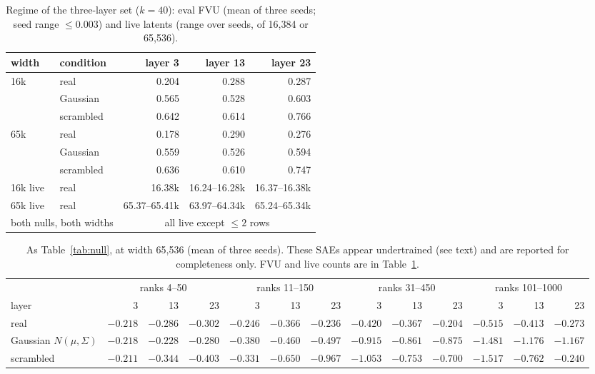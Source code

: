 \documentclass[10pt,twocolumn]{article}
\newcommand{\Sig}{\Sigma}
\begin{document}
\begin{table}[!htb]
\centering
\caption{Regime of the three-layer set ($k=40$): eval FVU (mean of three seeds; seed range $\le 0.003$) and live latents (range over seeds, of 16,384 or 65,536).}
\label{tab:fvu}
\footnotesize
\setlength{\tabcolsep}{2.5pt}
\begin{tabular}{ll rrr}
\toprule
width & condition & layer 3 & layer 13 & layer 23 \\
\midrule
\multirow{3}{*}{16k} & real & 0.204 & 0.288 & 0.287 \\
 & Gaussian & 0.565 & 0.528 & 0.603 \\
 & scrambled & 0.642 & 0.614 & 0.766 \\
\multirow{3}{*}{65k} & real & 0.178 & 0.290 & 0.276 \\
 & Gaussian & 0.559 & 0.526 & 0.594 \\
 & scrambled & 0.636 & 0.610 & 0.747 \\
\midrule
16k live & real & 16.38k & 16.24--16.28k & 16.37--16.38k \\
65k live & real & 65.37--65.41k & 63.97--64.34k & 65.24--65.34k \\
\multicolumn{2}{l}{both nulls, both widths} & \multicolumn{3}{c}{all live except $\le 2$ rows} \\
\bottomrule
\end{tabular}
\end{table}

\begin{table}[!htb]
\centering
\caption{As Table~\ref{tab:null}, at width 65,536 (mean of three seeds). These SAEs appear undertrained (see text) and are reported for completeness only. FVU and live counts are in Table~\ref{tab:fvu}.}
\label{tab:65k}
\footnotesize
\setlength{\tabcolsep}{3pt}
\begin{tabular}{l rrr rrr rrr rrr}
\toprule
 & \multicolumn{3}{c}{ranks 4--50} & \multicolumn{3}{c}{ranks 11--150} & \multicolumn{3}{c}{ranks 31--450} & \multicolumn{3}{c}{ranks 101--1000} \\
\cmidrule(lr){2-4}\cmidrule(lr){5-7}\cmidrule(lr){8-10}\cmidrule(lr){11-13}
layer & 3 & 13 & 23 & 3 & 13 & 23 & 3 & 13 & 23 & 3 & 13 & 23 \\
\midrule
real & $-0.218$ & $-0.286$ & $-0.302$ & $-0.246$ & $-0.366$ & $-0.236$ & $-0.420$ & $-0.367$ & $-0.204$ & $-0.515$ & $-0.413$ & $-0.273$ \\
Gaussian $N(\mu,\Sig)$ & $-0.218$ & $-0.228$ & $-0.280$ & $-0.380$ & $-0.460$ & $-0.497$ & $-0.915$ & $-0.861$ & $-0.875$ & $-1.481$ & $-1.176$ & $-1.167$ \\
scrambled & $-0.211$ & $-0.344$ & $-0.403$ & $-0.331$ & $-0.650$ & $-0.967$ & $-1.053$ & $-0.753$ & $-0.700$ & $-1.517$ & $-0.762$ & $-0.240$ \\
\bottomrule
\end{tabular}
\end{table}
\end{document}
